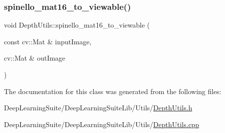 \subsubsection{\texorpdfstring{spinello\+\_\+mat16\+\_\+to\+\_\+viewable()}{spinello\_mat16\_to\_viewable()}}
{\footnotesize\ttfamily void Depth\+Utils\+::spinello\+\_\+mat16\+\_\+to\+\_\+viewable (\begin{DoxyParamCaption}\item[{const cv\+::\+Mat \&}]{input\+Image,  }\item[{cv\+::\+Mat \&}]{out\+Image }\end{DoxyParamCaption})\hspace{0.3cm}{\ttfamily [static]}}



The documentation for this class was generated from the following files\+:\begin{DoxyCompactItemize}
\item 
Deep\+Learning\+Suite/\+Deep\+Learning\+Suite\+Lib/\+Utils/\hyperlink{_depth_utils_8h}{Depth\+Utils.\+h}\item 
Deep\+Learning\+Suite/\+Deep\+Learning\+Suite\+Lib/\+Utils/\hyperlink{_depth_utils_8cpp}{Depth\+Utils.\+cpp}\end{DoxyCompactItemize}
